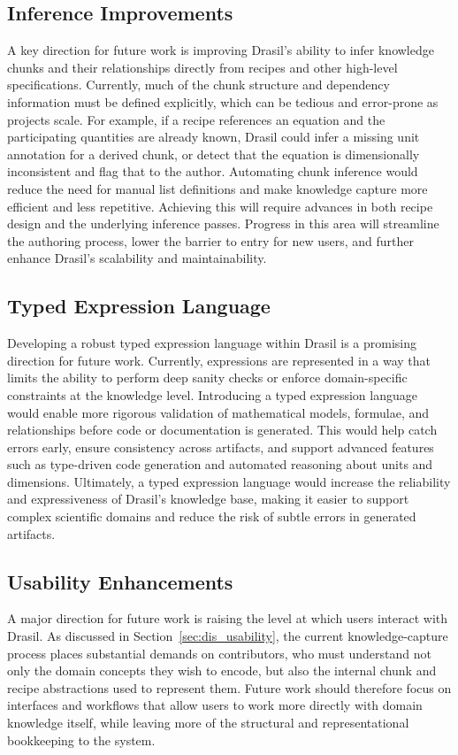\subsection{Inference Improvements}
A key direction for future work is improving Drasil's ability to infer
knowledge chunks and their relationships directly from recipes and other
high-level specifications. Currently, much of the chunk structure and
dependency information must be defined explicitly, which can be tedious and
error-prone as projects scale. For example, if a recipe references an equation 
and the participating quantities are already known, Drasil could infer a missing 
unit annotation for a derived chunk, or detect that the equation is dimensionally 
inconsistent and flag that to the author.
Automating chunk inference would reduce the
need for manual list definitions and make knowledge capture more efficient
and less repetitive. Achieving this will require advances in both recipe
design and the underlying inference passes. Progress in this area will
streamline the authoring process, lower the barrier to entry for new users,
and further enhance Drasil's scalability and maintainability.

\subsection{Typed Expression Language}
Developing a robust typed expression language within Drasil is a promising
direction for future work. Currently, expressions are represented in a way
that limits the ability to perform deep sanity checks or enforce domain-specific
constraints at the knowledge level. Introducing a typed expression
language would enable more rigorous validation of mathematical models,
formulae, and relationships before code or documentation is generated.
This would help catch errors early, ensure consistency across artifacts,
and support advanced features such as type-driven code generation and
automated reasoning about units and dimensions. Ultimately, a typed
expression language would increase the reliability and expressiveness of
Drasil's knowledge base, making it easier to support complex scientific
domains and reduce the risk of subtle errors in generated artifacts.

\subsection{Usability Enhancements}
A major direction for future work is raising the level at which users interact
with Drasil. As discussed in Section~\ref{sec:dis_usability}, the current
knowledge-capture process places substantial demands on contributors, who must
understand not only the domain concepts they wish to encode, but also the
internal chunk and recipe abstractions used to represent them. Future work
should therefore focus on interfaces and workflows that allow users to work
more directly with domain knowledge itself, while leaving more of the
structural and representational bookkeeping to the system.

